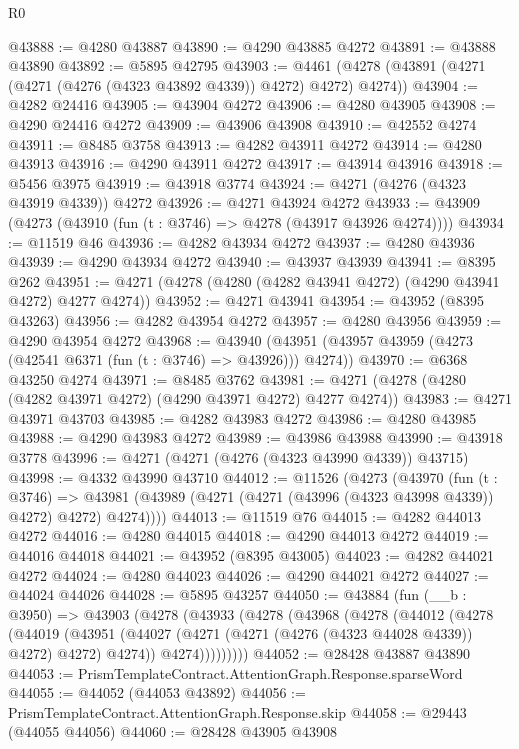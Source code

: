 \begin{lexlean}{R0}
\begin{coremodule}
@43888 := @4280 @43887
@43890 := @4290 @43885 @4272
@43891 := @43888 @43890
@43892 := @5895 @42795
@43903 := @4461 (@4278 (@43891 (@4271 (@4271 (@4276 (@4323 @43892 @4339)) @4272) @4272) @4274))
@43904 := @4282 @24416
@43905 := @43904 @4272
@43906 := @4280 @43905
@43908 := @4290 @24416 @4272
@43909 := @43906 @43908
@43910 := @42552 @4274
@43911 := @8485 @3758
@43913 := @4282 @43911 @4272
@43914 := @4280 @43913
@43916 := @4290 @43911 @4272
@43917 := @43914 @43916
@43918 := @5456 @3975
@43919 := @43918 @3774
@43924 := @4271 (@4276 (@4323 @43919 @4339)) @4272
@43926 := @4271 @43924 @4272
@43933 := @43909 (@4273 (@43910 (fun (t : @3746) => @4278 (@43917 @43926 @4274))))
@43934 := @11519 @46
@43936 := @4282 @43934 @4272
@43937 := @4280 @43936
@43939 := @4290 @43934 @4272
@43940 := @43937 @43939
@43941 := @8395 @262
@43951 := @4271 (@4278 (@4280 (@4282 @43941 @4272) (@4290 @43941 @4272) @4277 @4274))
@43952 := @4271 @43941
@43954 := @43952 (@8395 @43263)
@43956 := @4282 @43954 @4272
@43957 := @4280 @43956
@43959 := @4290 @43954 @4272
@43968 := @43940 (@43951 (@43957 @43959 (@4273 (@42541 @6371 (fun (t : @3746) => @43926))) @4274))
@43970 := @6368 @43250 @4274
@43971 := @8485 @3762
@43981 := @4271 (@4278 (@4280 (@4282 @43971 @4272) (@4290 @43971 @4272) @4277 @4274))
@43983 := @4271 @43971 @43703
@43985 := @4282 @43983 @4272
@43986 := @4280 @43985
@43988 := @4290 @43983 @4272
@43989 := @43986 @43988
@43990 := @43918 @3778
@43996 := @4271 (@4271 (@4276 (@4323 @43990 @4339)) @43715)
@43998 := @4332 @43990 @43710
@44012 := @11526
    (@4273
      (@43970
        (fun (t : @3746) =>
        @43981 (@43989 (@4271 (@4271 (@43996 (@4323 @43998 @4339)) @4272) @4272) @4274))))
@44013 := @11519 @76
@44015 := @4282 @44013 @4272
@44016 := @4280 @44015
@44018 := @4290 @44013 @4272
@44019 := @44016 @44018
@44021 := @43952 (@8395 @43005)
@44023 := @4282 @44021 @4272
@44024 := @4280 @44023
@44026 := @4290 @44021 @4272
@44027 := @44024 @44026
@44028 := @5895 @43257
@44050 := @43884
    (fun (__b : @3950) =>
    @43903
      (@4278
        (@43933
          (@4278
            (@43968
              (@4278
                (@44012
                  (@4278
                    (@44019
                      (@43951
                        (@44027 (@4271 (@4271 (@4276 (@4323 @44028 @4339)) @4272) @4272) @4274))
                      @4274)))))))))
@44052 := @28428 @43887 @43890
@44053 := PrismTemplateContract.AttentionGraph.Response.sparseWord
@44055 := @44052 (@44053 @43892)
@44056 := PrismTemplateContract.AttentionGraph.Response.skip
@44058 := @29443 (@44055 @44056)
@44060 := @28428 @43905 @43908

\end{coremodule}
\end{lexlean}
